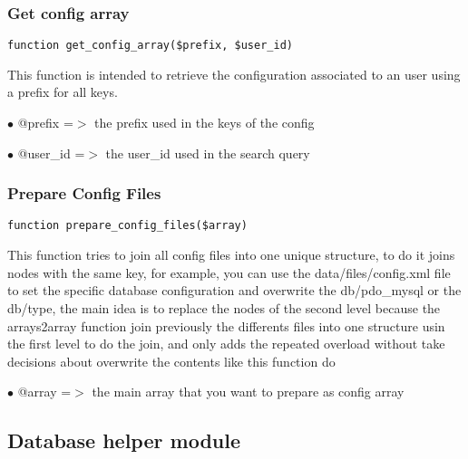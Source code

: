 \documentclass[a4paper]{article}
\begin{document}
\hypertarget{toc81}{}
\subsubsection{Get config array}

\begin{lstlisting}
function get_config_array($prefix, $user_id)
\end{lstlisting}

This function is intended to retrieve the configuration associated to an user
using a prefix for all keys.

\begin{compactitem}
\item[\color{myblue}$\bullet$] @prefix  =$>$ the prefix used in the keys of the config
\item[\color{myblue}$\bullet$] @user\_id =$>$ the user\_id used in the search query
\end{compactitem}

\hypertarget{toc82}{}
\subsubsection{Prepare Config Files}

\begin{lstlisting}
function prepare_config_files($array)
\end{lstlisting}

This function tries to join all config files into one unique structure, to do it
joins nodes with the same key, for example, you can use the data/files/config.xml
file to set the specific database configuration and overwrite the db/pdo\_mysql or
the db/type, the main idea is to replace the nodes of the second level because the
arrays2array function join previously the differents files into one structure usin
the first level to do the join, and only adds the repeated overload without take
decisions about overwrite the contents like this function do

\begin{compactitem}
\item[\color{myblue}$\bullet$] @array =$>$ the main array that you want to prepare as config array
\end{compactitem}

\hypertarget{toc83}{}
\subsection{Database helper module}
\end{document}
